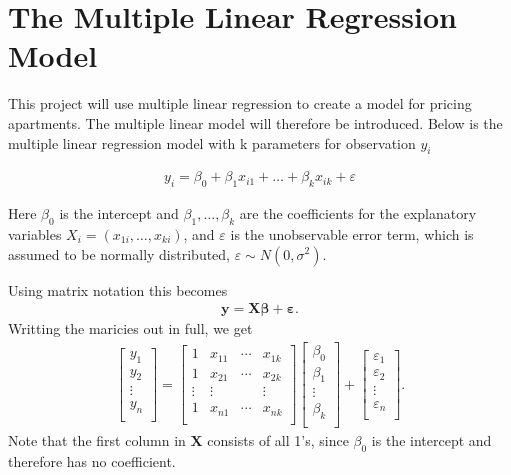 \section{The Multiple Linear Regression Model}

This project will use multiple linear regression to create a model for pricing apartments. The multiple linear model will therefore be introduced. Below is the multiple linear regression model with k parameters for observation $y_i$

\begin{align}
  y_i = \beta_0 + \beta_1 x_{i1} + \ldots + \beta_k x_{ik} + \varepsilon
\end{align}

Here $\beta_0$ is the intercept and $\beta_1, \ldots, \beta_k$ are the coefficients for the explanatory variables $X_i = (x_{1i}, \ldots, x_{ki})$, and $\varepsilon$ is the unobservable error term, which is assumed to be normally distributed, $\varepsilon \sim N(0, \sigma^2)$. 

Using matrix notation this becomes
\begin{align}\label{eq:multiple_linear_regression_model}
    \mathbf{y} = \mathbf{X} \boldsymbol{\beta} + \boldsymbol{\varepsilon}.
\end{align}
Writting the maricies out in full, we get
\begin{align}
  \begin{bmatrix}
    y_1 \\ y_2 \\ \vdots \\ y_n \\
  \end{bmatrix}
  =
  \begin{bmatrix}
    1 & x_{11} & \cdots & x_{1k} \\
    1 & x_{21} & \cdots & x_{2k} \\ \vdots & \vdots & & \vdots \\ 1 & x_{n1} & \cdots & x_{nk} \\
  \end{bmatrix}
  \begin{bmatrix}
    \beta_0 \\ \beta_1 \\ \vdots \\ \beta_k \\
  \end{bmatrix} +
  \begin{bmatrix}
    \varepsilon_1 \\ \varepsilon_2 \\ \vdots \\ \varepsilon_n \\
  \end{bmatrix}.
\end{align}
Note that the first column  in $\boldsymbol{X}$ consists of all 1's, since $\beta_{0}$ is the intercept and therefore has no coefficient. 

